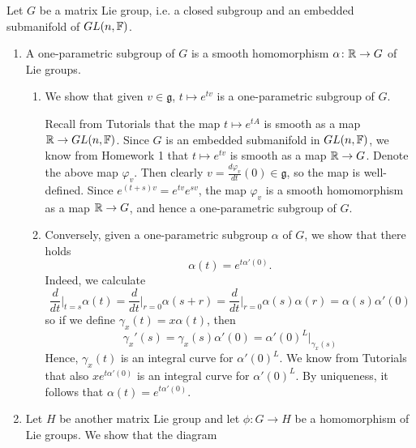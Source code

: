 \documentclass[a4paper, 12pt]{article}
\begin{document}
\begin{Exercise}
    Let $G$ be a matrix Lie group, i.e. a closed subgroup and an embedded submanifold of $GL(n, \mathbb{F})$.
    \begin{enumerate}[label=(\roman*)]
        \item A one-parametric subgroup of $G$ is a smooth homomorphism $\alpha \colon \mathbb{R} \to G$ of Lie groups.
            \begin{enumerate}[label=(\alph*)]
                \item We show that given $v \in \mathfrak{g}$, $t \mapsto e^{tv}$ is a one-parametric subgroup of $G$.
                    
                    Recall from Tutorials that the map $t \mapsto e^{tA}$ is smooth as a map $\mathbb{R} \to GL(n, \mathbb{F})$.
                    Since $G$ is an embedded submanifold in $GL(n, \mathbb{F})$, we know from Homework 1 that $t \mapsto e^{tv}$ is smooth as a map $\mathbb{R} \to G$.
                    Denote the above map $\varphi_v$.
                    Then clearly $v = \frac{d\varphi_v}{dt}(0) \in \mathfrak{g}$, so the map is well-defined.
                    Since $e^{(t + s)v} = e^{tv}e^{sv}$, the map $\varphi_v$ is a smooth homomorphism as a map $\mathbb{R} \to G$, and hence a one-parametric subgroup of $G$.
                \item Conversely, given a one-parametric subgroup $\alpha$ of $G$, we show that there holds
                    \[
                        \alpha(t) = e^{t\alpha'(0)}.
                    \]
                    Indeed, we calculate
                    \[
                        \frac{d}{dt}\Big|_{t=s} \alpha(t) = \frac{d}{dt}\Big|_{r=0}\alpha(s+r) = \frac{d}{dt}\Big|_{r=0}\alpha(s)\alpha(r) = \alpha(s)\alpha'(0)
                    \]
                    so if we define $\gamma_x(t) = x\alpha(t)$, then
                    \[
                        \gamma_x'(s) = \gamma_x(s)\alpha'(0) = \alpha'(0)^L\Big|_{\gamma_x(s)}
                    \]
                    Hence, $\gamma_x(t)$ is an integral curve for $\alpha'(0)^L$.
                    We know from Tutorials that also $xe^{t\alpha'(0)}$ is an integral curve for $\alpha'(0)^L$.
                    By uniqueness, it follows that $\alpha(t) = e^{t\alpha'(0)}$.
            \end{enumerate}
        \item Let $H$ be another matrix Lie group and let $\phi \colon G \to H$ be a homomorphism of Lie groups.
            We show that the diagram
            

\end{enumerate}
\end{Exercise}
\end{document}
